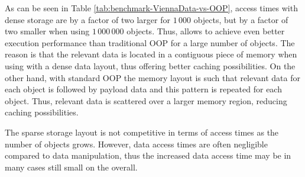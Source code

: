 As can be seen in Table \ref{tab:benchmark-ViennaData-vs-OOP}, access times with dense storage are by a factor of two larger for $1\,000$ objects, but by a factor of two smaller when using $1\,000\,000$ objects.
Thus, {\ViennaData} allows to achieve even better execution performance than traditional OOP for a large number of objects. The reason is that the relevant data is located in a contiguous piece of memory when using {\ViennaData} with a dense data layout, thus offering better caching possibilities. On the other hand, with standard OOP the memory layout is such that relevant data for each object is followed by payload data and this pattern is repeated for each object. Thus, relevant data is scattered over a larger memory region, reducing caching possibilities.

The sparse storage layout is not competitive in terms of access times as the number of objects grows. However, data access times are often negligible compared to data manipulation, thus
the increased data access time may be in many cases still small on the overall.
